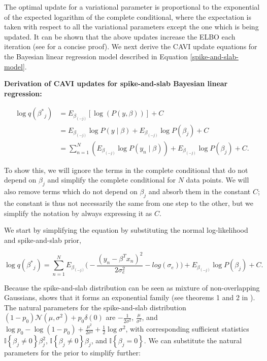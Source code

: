 %
The optimal update for a variational parameter is proportional to the exponential of the expected logarithm of the complete conditional, where the expectation is taken with respect to all the variational parameters except the one which is being updated.
%
It can be shown that the above updates increase the ELBO each iteration (see \cite{blei2017variational} for a concise proof).
%
We next derive the CAVI update equations for the Bayesian linear regression model described in Equation \ref{spike-and-slab-model}.
%

%
\vspace{3mm}
\noindent \textbf{Derivation of CAVI updates for spike-and-slab Bayesian linear regression:}

\begin{align}
    \log q(\beta^{*}{_j}) &= E_{\beta_{(-j)}} [\log(P(y, \beta))] + C \nonumber \\
    &= E_{\beta_{(-j)}} \log P(y \mid \beta) + E_{\beta_{(-j)}} \log P(\beta_j) + C \nonumber \\
    &= \sum_{n=1}^N \left( E_{\beta_{(-j)}} \log P(y_n \mid \beta) \right) + E_{\beta_{(-j)}} \log P(\beta_j) + C \label{cavi-1}.
\end{align}

%
To show this, we will ignore the terms in the complete conditional that do not depend on $\beta_j$ and simplify the complete conditional for $N$ data points.
%
We will also remove terms which do not depend on $\beta_j$ and absorb them in the constant $C$; the constant is thus not necessarily the same from one step to the other, but we simplify the notation by always expressing it as $C$.
%

%
We start by simplifying the equation by substituting the normal log-likelihood and spike-and-slab prior,

\begin{equation}
    \log q(\beta^{*}{_j}) = \sum_{n=1}^N E_{\beta_{(-j)}} \Big(- \frac{(y_n - \beta^T x_n)^2}{2 \sigma_e^2}  - log(\sigma_{e}) \Big)+ E_{\beta_{(-j)}}  \log P(\beta_j) + C.
\end{equation}

%
Because the spike-and-slab distribution can be seen as mixture of non-overlapping Gaussians, \cite{spence2020flexible} shows that it forms an exponential family (see theorems 1 and 2 in \cite{spence2020flexible}).
%
The natural parameters for the spike-and-slab distribution $(1-p_0) \mathcal{N}(\mu, \sigma^2) + p_0 \delta(0)$ are $-\frac{1}{2\sigma^2}$, $\frac{\mu}{\sigma^2}$, and $\log p_0 - \log (1-p_0) + \frac{\mu^2}{2\sigma^2} + \frac{1}{2}\log \sigma^2$, with corresponding sufficient statistics $\mathbb{I}\left\{\beta_j \ne 0\right\} \beta_j^2$, $\mathbb{I}\left\{\beta_j \ne 0\right\} \beta_j$, and $\mathbb{I}\left\{\beta_j = 0\right\}$.
%
We can substitute the natural parameters for the prior to simplify further: 

